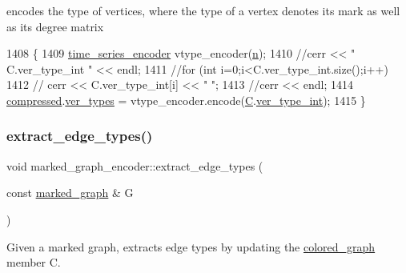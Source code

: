 encodes the type of vertices, where the type of a vertex denotes its mark as well as its degree matrix 


\begin{DoxyCode}
1408 \{
1409   \hyperlink{classtime__series__encoder}{time\_series\_encoder} vtype\_encoder(\hyperlink{classmarked__graph__encoder_a4c66d9fdbc14c97523715aac7e4511cb}{n});
1410   \textcolor{comment}{//cerr << " C.ver\_type\_int " << endl;}
1411   \textcolor{comment}{//for (int i=0;i<C.ver\_type\_int.size();i++)}
1412   \textcolor{comment}{//  cerr << C.ver\_type\_int[i] << " ";}
1413   \textcolor{comment}{//cerr << endl;}
1414   \hyperlink{classmarked__graph__encoder_ac2ded200860fdd2321f86dd76b28bcb3}{compressed}.\hyperlink{classmarked__graph__compressed_af446cc5e23c241a92b76642fd5ebc403}{ver\_types} = vtype\_encoder.encode(\hyperlink{classmarked__graph__encoder_af82bc0653414091291cb75553a407bdb}{C}.\hyperlink{classcolored__graph_a491ed2ea1a65118af02ec606c8d44c0a}{ver\_type\_int});
1415 \}
\end{DoxyCode}
\mbox{\label{classmarked__graph__encoder_ac3060e8f7e6abbe371c5968eb47cb8a1}} 
\subsubsection{\texorpdfstring{extract\+\_\+edge\+\_\+types()}{extract\_edge\_types()}}
{\footnotesize\ttfamily void marked\+\_\+graph\+\_\+encoder\+::extract\+\_\+edge\+\_\+types (\begin{DoxyParamCaption}\item[{const \hyperlink{classmarked__graph}{marked\+\_\+graph} \&}]{G }\end{DoxyParamCaption})\hspace{0.3cm}{\ttfamily [private]}}



Given a marked graph, extracts edge types by updating the \hyperlink{classcolored__graph}{colored\+\_\+graph} member C. 


